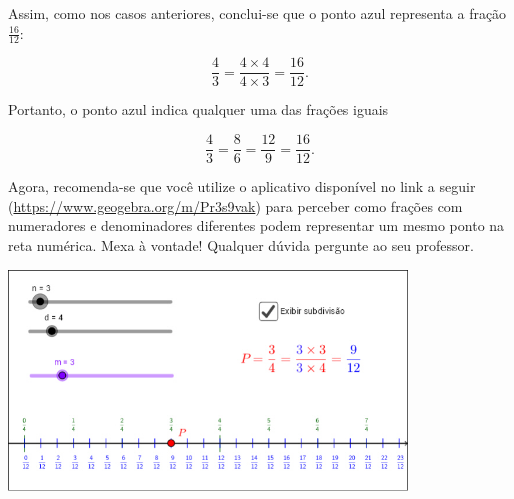 \begin{refletindo*}
\begin{center}
\end{center}

Assim, como nos casos anteriores, conclui-se que o ponto azul representa a fração $\frac{16}{12}$:

$$\dfrac{4}{3} = \dfrac{4 \times 4}{4 \times 3} = \dfrac{16}{12}.$$

Portanto, o ponto azul indica qualquer uma das frações iguais

$$\dfrac{4}{3} = \dfrac{8}{6} = \dfrac{12}{9} = \dfrac{16}{12}.$$

Agora, recomenda-se que você utilize o aplicativo disponível no link a seguir (\url{https://www.geogebra.org/m/Pr3s9vak}) para perceber como frações com numeradores e denominadores diferentes podem representar um mesmo ponto  na reta numérica. Mexa à vontade! Qualquer dúvida pergunte ao seu professor.
\begin{center}
\includegraphics[width=300pt, keepaspectratio]{..//media//cap4/secoes/geogebra-reta-numerica-equivalencia.jpg}
\end{center}


\end{refletindo*}
